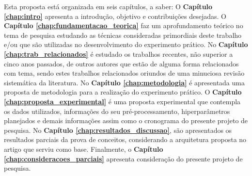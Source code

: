 Esta proposta está organizada em seis capítulos, a saber:
O \textbf{Capítulo \ref{chap:intro}} apresenta a introdução, objetivo e contribuições desejadas. O \textbf{Capítulo \ref{chap:fundamentacao_teorica}} faz um aprofundamento teórico no tema de pesquisa estudando as técnicas consideradas primordiais deste trabalho e/ou que são utilizadas no desenvolvimento do experimento prático. No \textbf{Capítulo \ref{chap:trab_relacionados}} é estudado  os trabalhos recentes, não superior a cinco anos passados, de outros autores que estão de alguma forma relacionados com tema, sendo estes trabalhos relacionados oriundos de uma minuciosa revisão sistemática da literatura. No \textbf{Capítulo \ref{chap:metodologia}} é apresentada uma proposta de metodologia para a realização do experimento prático. O \textbf{Capítulo \ref{chap:proposta_experimental}} é uma proposta experimental que contempla os dados utilizados, informações do seu pré-processamento, hiperparâmetros planejados e demais informações assim como o cronograma do presente projeto de pesquisa. No \textbf{Capítulo \ref{chap:resultados_discussao}}, são apresentados os resultados parciais da prova de conceitos, considerando a arquitetura proposta no artigo que serviu como base. Finalmente, o \textbf{Capítulo \ref{chap:consideracoes_parciais}} apresenta consideração do presente projeto de pesquisa.
